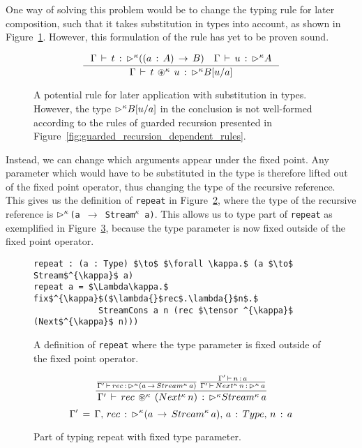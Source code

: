 One way of solving this problem would be to change the typing rule for later
composition, such that it takes substitution in types into account, as shown in
Figure~\ref{fig:tensor_with_subst}. However, this formulation of the rule has
yet to be proven sound.

\begin{figure}[h]
\[
\inference { \Gamma \, \vdash \, t\, :\, \later^{\kappa} ((a\, :\, A)\,
  \rightarrow \, B)\quad \Gamma \, \vdash \, u\, :\, \later^{\kappa} A }{
  \Gamma \, \vdash \, t\, \tensor ^{\kappa} \, u\, :\, \later^{\kappa} B[{ u
  }/{ a }] } 
\]
  \caption{A potential rule for later application with substitution in
    types. However, the type $\rhd^{\kappa} B[{ u }/{ a }]$ in the conclusion
    is not well-formed according to the rules of guarded recursion presented in Figure~\ref{fig:guarded_recursion_dependent_rules}.}
  \label{fig:tensor_with_subst}
\end{figure}

Instead, we can change which arguments appear under the fixed point. Any
parameter which would have to be substituted in the type is therefore lifted out
of the fixed point operator, 
thus changing the type of the recursive reference. This gives us
the definition of \texttt{repeat} in
Figure~\ref{fig:repeat_guarded_example_new}, where the type of the recursive
reference is \texttt{$\rhd ^{\kappa}$(a~$\rightarrow$~Stream$^{\kappa}$
  a)}. This allows us to type part of \texttt{repeat} as exemplified in
Figure~\ref{fig:repeat_typing_new}, because the type parameter is now fixed
outside of the fixed point operator.

\begin{figure}[h]
  \begin{lstlisting}[mathescape,title=\ttBlock]
repeat : (a : Type) $\to$ $\forall \kappa.$ (a $\to$ Stream$^{\kappa}$ a)
repeat a = $\Lambda\kappa.$ fix$^{\kappa}$($\lambda{}$rec$.\lambda{}$n$.$ 
             StreamCons a n (rec $\tensor ^{\kappa}$ (Next$^{\kappa}$ n)))
\end{lstlisting}
  \caption{A definition of \texttt{repeat} where the type parameter is fixed
    outside of the fixed point operator.}
  \label{fig:repeat_guarded_example_new}
\end{figure}

\begin{figure}[h]
\[
\frac { \frac {  }{ \Gamma '\, \vdash \, rec\, :\, \rhd ^{\kappa}(a\, \rightarrow
    \, Stream^{\kappa}\, a) } \, \frac { \Gamma '\, \vdash \, n\, :\, a }{ \Gamma '\,
    \vdash \, Next^{\kappa}\, n\, :\, \rhd ^{\kappa}\, a }  }{ \, \Gamma '\, \vdash \, rec\,
  \circledast ^{\kappa} \, (Next^{\kappa}\, n)\, :\, \rhd ^{\kappa}Stream^{\kappa}\, a }
\]
\[
 \Gamma '\, =\, \Gamma ,\, rec\, :\, \rhd ^{\kappa}(a\, \rightarrow \, Stream^{\kappa}\,
 a),\, a\, :\, Type,\, n\, :\, a
\]

  \caption{Part of typing repeat with fixed type parameter.}
  \label{fig:repeat_typing_new}
\end{figure}

